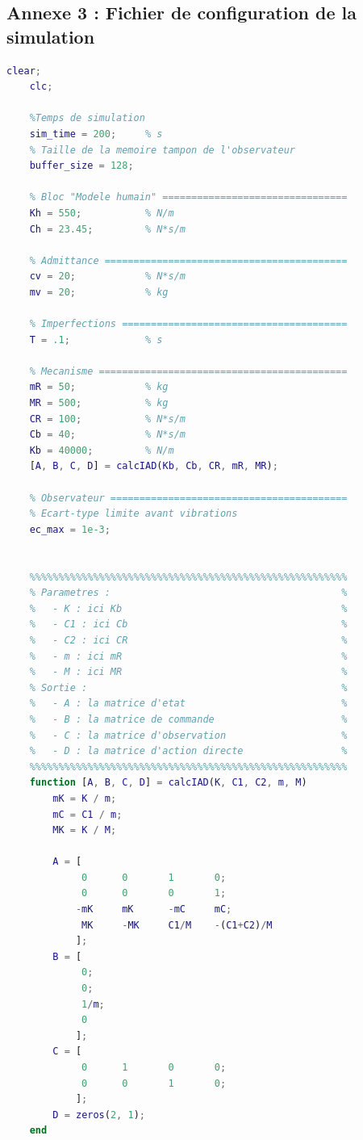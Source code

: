 \documentclass[a4paper,12pt]{article}
\begin{document}
    \subsection{Annexe 3 : Fichier de configuration de la simulation} \label{Annexe:configSimu}
    \begin{lstlisting}[caption={Fichier de configuration de la simulation}, language=Matlab]
    clear;
    clc;

    %Temps de simulation
    sim_time = 200;     % s
    % Taille de la memoire tampon de l'observateur
    buffer_size = 128;

    % Bloc "Modele humain" ================================
    Kh = 550;           % N/m
    Ch = 23.45;         % N*s/m
    
    % Admittance ==========================================
    cv = 20;            % N*s/m
    mv = 20;            % kg
    
    % Imperfections =======================================
    T = .1;             % s

    % Mecanisme ===========================================
    mR = 50;            % kg
    MR = 500;           % kg
    CR = 100;           % N*s/m
    Cb = 40;            % N*s/m
    Kb = 40000;         % N/m
    [A, B, C, D] = calcIAD(Kb, Cb, CR, mR, MR);

    % Observateur =========================================
    % Ecart-type limite avant vibrations
    ec_max = 1e-3;

    
    %%%%%%%%%%%%%%%%%%%%%%%%%%%%%%%%%%%%%%%%%%%%%%%%%%%%%%%
    % Parametres :                                        %
    %   - K : ici Kb                                      %
    %   - C1 : ici Cb                                     %
    %   - C2 : ici CR                                     %
    %   - m : ici mR                                      %
    %   - M : ici MR                                      %
    % Sortie :                                            %
    %   - A : la matrice d'etat                           %
    %   - B : la matrice de commande                      %
    %   - C : la matrice d'observation                    %
    %   - D : la matrice d'action directe                 %
    %%%%%%%%%%%%%%%%%%%%%%%%%%%%%%%%%%%%%%%%%%%%%%%%%%%%%%%
    function [A, B, C, D] = calcIAD(K, C1, C2, m, M)
        mK = K / m;
        mC = C1 / m;
        MK = K / M;
    
        A = [
             0      0       1       0;
             0      0       0       1;
            -mK     mK      -mC     mC;
             MK     -MK     C1/M    -(C1+C2)/M
            ];
        B = [
             0;
             0;
             1/m;
             0
            ];
        C = [
             0      1       0       0;
             0      0       1       0;
            ];
        D = zeros(2, 1);
    end
    \end{lstlisting}
\end{document}
